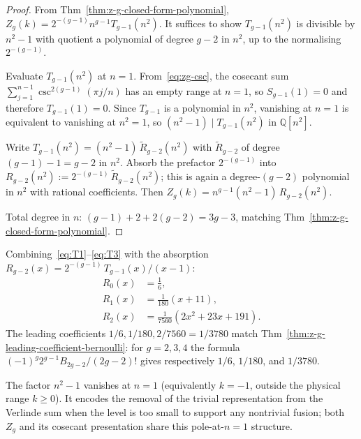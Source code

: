 \begin{proof}
From Thm~\ref{thm:z-g-closed-form-polynomial},
$Z_g(k) = 2^{-(g-1)} n^{g-1} T_{g-1}(n^2)$. It suffices to show
$T_{g-1}(n^2)$ is divisible by $n^2 - 1$ with quotient a polynomial of degree
$g-2$ in $n^2$, up to the normalising $2^{-(g-1)}$.

Evaluate $T_{g-1}(n^2)$ at $n = 1$. From~\eqref{eq:zg-csc}, the cosecant sum
$\sum_{j=1}^{n-1} \csc^{2(g-1)}(\pi j / n)$ has an empty range at $n = 1$,
so $S_{g-1}(1) = 0$ and therefore $T_{g-1}(1) = 0$. Since $T_{g-1}$ is a
polynomial in $n^2$, vanishing at $n=1$ is equivalent to vanishing at
$n^2 = 1$, so $(n^2 - 1) \mid T_{g-1}(n^2)$ in $\mathbb{Q}[n^2]$.

Write $T_{g-1}(n^2) = (n^2 - 1)\,\widetilde R_{g-2}(n^2)$ with $\widetilde
R_{g-2}$ of degree $(g-1) - 1 = g-2$ in $n^2$. Absorb the prefactor
$2^{-(g-1)}$ into $R_{g-2}(n^2) := 2^{-(g-1)}\,\widetilde R_{g-2}(n^2)$; this
is again a degree-$(g-2)$ polynomial in $n^2$ with rational coefficients. Then
$Z_g(k) = n^{g-1}(n^2 - 1)\,R_{g-2}(n^2)$. \checkmark

Total degree in $n$: $(g-1) + 2 + 2(g-2) = 3g - 3$, matching
Thm~\ref{thm:z-g-closed-form-polynomial}. \checkmark
\end{proof}

\begin{remark}
\label{rem:r-explicit}
Combining~\eqref{eq:T1}--\eqref{eq:T3} with the absorption $R_{g-2}(x) =
2^{-(g-1)}\,T_{g-1}(x)/(x-1)$:
\begin{align}
R_0(x) &= \tfrac{1}{6}, \\
R_1(x) &= \tfrac{1}{180}(x + 11), \\
R_2(x) &= \tfrac{1}{7560}(2 x^2 + 23 x + 191).
\end{align}
The leading coefficients $1/6, 1/180, 2/7560 = 1/3780$ match
Thm~\ref{thm:z-g-leading-coefficient-bernoulli}: for
$g=2,3,4$ the formula
$(-1)^g2^{g-1}B_{2g-2}/(2g-2)!$ gives respectively
$1/6$, $1/180$, and $1/3780$.
\end{remark}

\begin{remark}
\label{rem:uniform-factor}
The factor $n^2 - 1$ vanishes at $n = 1$ (equivalently $k = -1$, outside the
physical range $k \ge 0$). It encodes the removal of the trivial
representation from the Verlinde sum when the level is too small to
support any nontrivial fusion; both $Z_g$ and its cosecant presentation
share this pole-at-$n=1$ structure.
\end{remark}

